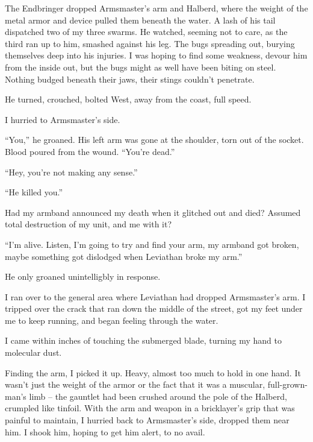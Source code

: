 The Endbringer dropped Armsmaster's arm and Halberd, where the weight of the metal armor and device pulled them beneath the water.  A lash of his tail dispatched two of my three swarms.  He watched, seeming not to care, as the third ran up to him, smashed against his leg.  The bugs spreading out, burying themselves deep into his injuries. I was hoping to find some weakness, devour him from the inside out, but the bugs might as well have been biting on steel.  Nothing budged beneath their jaws, their stings couldn't penetrate.



He turned, crouched, bolted West, away from the coast, full speed.



I hurried to Armsmaster's side.



``You,'' he groaned.  His left arm was gone at the shoulder, torn out of the socket.  Blood poured from the wound.  ``You're dead.''



``Hey, you're not making any sense.''



``He killed you.''



Had my armband announced my death when it glitched out and died?  Assumed total destruction of my unit, and me with it?



``I'm alive.  Listen, I'm going to try and find your arm, my armband got broken, maybe something got dislodged when Leviathan broke my arm.''



He only groaned unintelligbly in response.



I ran over to the general area where Leviathan had dropped Armsmaster's arm.   I tripped over the crack that ran down the middle of the street, got my feet under me to keep running, and began feeling through the water.



I came within inches of touching the submerged blade, turning my hand to molecular dust.



Finding the arm, I picked it up.  Heavy, almost too much to hold in one hand.  It wasn't just the weight of the armor or the fact that it was a muscular, full-grown-man's limb – the gauntlet had been crushed around the pole of the Halberd, crumpled like tinfoil.  With the arm and weapon in a bricklayer's grip that was painful to maintain, I hurried back to Armsmaster's side, dropped them near him.  I shook him, hoping to get him alert, to no avail.



